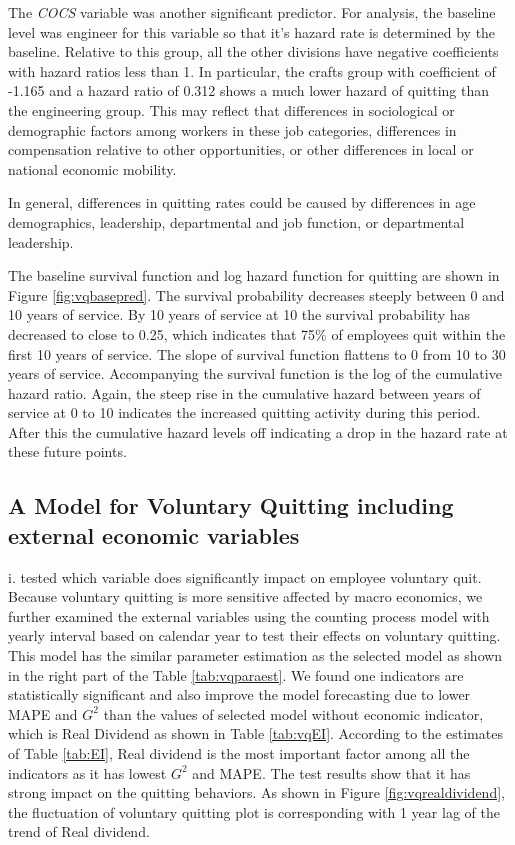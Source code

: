 \documentclass[12pt,letterpaper]{article}
\begin{document}
The {\it COCS} variable was another significant predictor.  For analysis, the baseline level was engineer for this variable so that it's hazard rate is determined by the baseline. Relative to this group, all the other divisions have negative coefficients with hazard ratios less than 1. In particular, the crafts group with coefficient of -1.165 and a hazard ratio of 0.312 shows a much lower hazard of quitting than the engineering group.  This may reflect that differences in sociological or demographic factors among workers in these job categories, differences in compensation relative to other opportunities, or other differences in local or national economic mobility.

In general, differences in quitting rates could be caused by differences in age demographics, leadership, departmental and job function, or departmental leadership.

The baseline survival function and log hazard function for quitting are shown in Figure \ref{fig:vqbasepred}. The survival probability decreases steeply between 0 and 10 years of service. By 10 years of service at 10 the survival probability has decreased to close to 0.25, which indicates that 75\% of employees quit within the first 10 years of service.  The slope of survival function flattens to 0 from 10 to 30 years of service.  Accompanying the survival function is the log of the cumulative hazard ratio.  Again, the steep rise in the cumulative hazard between years of service at 0 to 10 indicates the increased quitting activity during this period.  After this the cumulative hazard levels off indicating a drop in the hazard rate at these future points.


\subsection{A Model for Voluntary Quitting including external economic variables}
i. tested which variable does significantly impact on employee voluntary quit.
Because voluntary quitting is more sensitive affected by macro economics, we further examined the external variables using the counting process model with yearly interval based on calendar year to test their effects on voluntary quitting. This model has the similar parameter estimation as the selected model as shown in the right part of the Table \ref{tab:vqparaest}. We found one indicators are statistically significant and also improve the model forecasting due to lower MAPE and $G^2$ than the values of selected model without economic indicator, which is Real Dividend as shown in Table \ref{tab:vqEI}. According to the estimates of Table \ref{tab:EI}, Real dividend is the most important factor among all the indicators as it has lowest $G^2$ and MAPE. The test results show that it has strong impact on the quitting behaviors. As shown in Figure \ref{fig:vqrealdividend}, the fluctuation of voluntary quitting plot is corresponding with 1 year lag of the trend of Real dividend.
\end{document}
